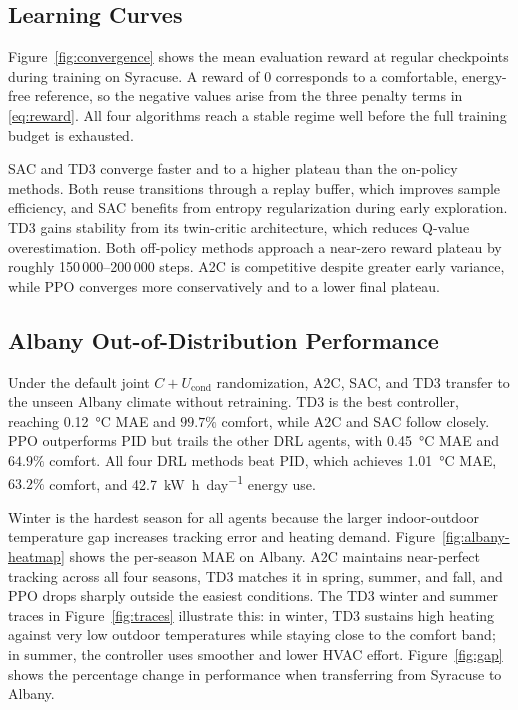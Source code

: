 \documentclass[conference]{IEEEtran}
\begin{document}
\subsection{Learning Curves}
\label{subsec:learning-curves}

Figure~\ref{fig:convergence} shows the mean evaluation reward at regular
checkpoints during training on Syracuse. A reward of $0$ corresponds to
a comfortable, energy-free reference, so the negative values arise from
the three penalty terms in \eqref{eq:reward}. All four algorithms reach
a stable regime well before the full training budget is exhausted.

SAC and TD3 converge faster and to a higher plateau than the on-policy
methods. Both reuse transitions through a replay buffer, which improves
sample efficiency, and SAC benefits from entropy regularization during
early exploration. TD3 gains stability from its twin-critic architecture,
which reduces Q-value overestimation. Both off-policy methods approach a
near-zero reward plateau by roughly 150\,000--200\,000 steps. A2C is
competitive despite greater early variance, while PPO converges more
conservatively and to a lower final plateau.


\subsection{Albany Out-of-Distribution Performance}
\label{subsec:generalisation}

Under the default joint $C{+}U_{\text{cond}}$ randomization, A2C, SAC, and TD3 transfer
to the unseen Albany climate without retraining. TD3 is the best
controller, reaching \SI{0.12}{\degreeCelsius} MAE and $99.7\%$ comfort,
while A2C and SAC follow closely. PPO outperforms PID but trails the
other DRL agents, with \SI{0.45}{\degreeCelsius} MAE and $64.9\%$
comfort. All four DRL methods beat PID, which achieves
\SI{1.01}{\degreeCelsius} MAE, $63.2\%$ comfort, and
\SI{42.7}{\kilo\watt\hour\per day} energy use.

Winter is the hardest season for all agents because the larger
indoor-outdoor temperature gap increases tracking error and heating
demand. Figure~\ref{fig:albany-heatmap} shows the per-season MAE on
Albany. A2C maintains near-perfect tracking across all four seasons,
TD3 matches it in spring, summer, and fall, and PPO drops sharply
outside the easiest conditions. The TD3 winter and summer traces in
Figure~\ref{fig:traces} illustrate this: in winter, TD3 sustains high
heating against very low outdoor temperatures while staying close to
the comfort band; in summer, the controller uses smoother and lower
HVAC effort. Figure~\ref{fig:gap} shows the percentage change in
performance when transferring from Syracuse to Albany.
\end{document}
